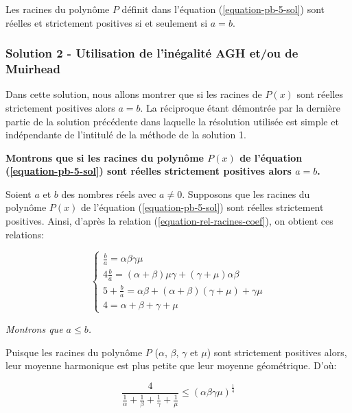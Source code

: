 \documentclass[12pt,a4paper,article]{memoir}
\begin{document}
Les racines du polynôme $P$ définit dans l'équation (\ref{equation-pb-5-sol}) sont réelles et strictement positives si et seulement si $a=b$.

\subsubsection{Solution 2 - Utilisation de l'inégalité AGH et/ou de Muirhead}

Dans cette solution, nous allons montrer que si les racines de $P(x)$ sont réelles strictement positives alors $a=b$. La réciproque étant démontrée par la dernière partie de la solution précédente dans laquelle la résolution utilisée est simple et indépendante de l'intitulé de la méthode de la solution 1.

\bigskip

\textbf{Montrons que si les racines du polynôme $P(x)$ de l'équation (\ref{equation-pb-5-sol}) sont réelles strictement positives alors $a=b$.}

\bigskip

Soient $a$ et $b$ des nombres réels avec $a \neq 0$. Supposons que les racines du polynôme $P(x)$ de l'équation (\ref{equation-pb-5-sol}) sont réelles strictement positives. Ainsi, d'après la relation (\ref{equation-rel-racines-coef}), on obtient ces relations:

\bigskip

\[
\left\{
	\begin{array}{l}
	\frac{b}{a} = \alpha\beta\gamma\mu\\
	4\frac{b}{a} = (\alpha + \beta)\mu\gamma + (\gamma + \mu)\alpha\beta\\
	5+\frac{b}{a} = \alpha\beta + (\alpha + \beta)(\gamma + \mu) + \gamma\mu\\
	4 = \alpha + \beta + \gamma + \mu
	\end{array}
\right.
\]

\bigskip

\textit{Montrons que $a \leq b$.}

\bigskip

Puisque les racines du polynôme $P$ ($\alpha$, $\beta$, $\gamma$ et $\mu$) sont strictement positives alors, leur moyenne harmonique est plus petite que leur moyenne géométrique. D'où:

\begin{equation}
\frac{4}{\frac{1}{\alpha} + \frac{1}{\beta} + \frac{1}{\gamma} + \frac{1}{\mu}} \leq (\alpha \beta \gamma \mu)^{\frac{1}{4}}
\label{equation-ihg}
\end{equation}
\end{document}
